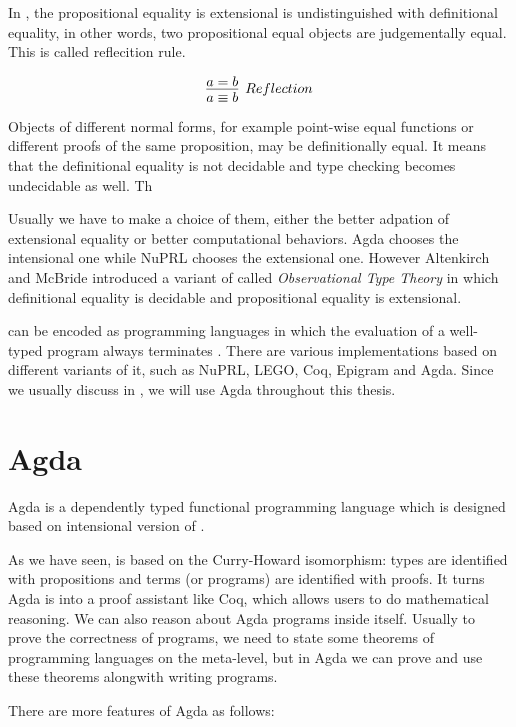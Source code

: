 In \ett, the propositional equality is extensional is undistinguished with definitional equality, in other words, two propositional equal objects are judgementally equal. This is called reflecition rule.

\begin{equation*}
\infer[Reflection]{a \equiv b}{a = b}
\end{equation*}

Objects of different normal forms, for example point-wise equal functions or different proofs of the same proposition, may be definitionally equal. It means that the definitional equality is not decidable and type checking becomes undecidable as well. Th


Usually we have to make a choice of them, either the better adpation of extensional equality or better computational behaviors. Agda chooses the intensional one while NuPRL chooses the extensional one. However
Altenkirch and McBride introduced a variant of \ett called
\emph{Observational Type Theory}  \cite{alt:06} in which definitional equality is
decidable and propositional equality is extensional.


\mltt can be encoded as programming languages in
which the evaluation of a well-typed program always terminates \cite{nor:90}.
There are various implementations based on different variants of it, such as
NuPRL, LEGO, Coq, Epigram and Agda. Since we usually discuss in \itt, we will use Agda throughout this thesis.

\section{Agda}



Agda is a dependently typed functional programming language which is designed based on intensional version
of \mltt{} \cite{agdawiki:main}. 

As we have seen, \mltt{} is based on the Curry-Howard
isomorphism: types are identified with propositions and terms (or programs) are identified with proofs. It turns Agda is into a proof assistant like Coq, which allows users to do mathematical reasoning. We can also reason about Agda programs inside itself.
Usually to prove the correctness of programs, we need to state some theorems of programming languages on the meta-level, but in Agda we can prove and use these theorems alongwith writing programs.

There are more features of Agda as follows:

